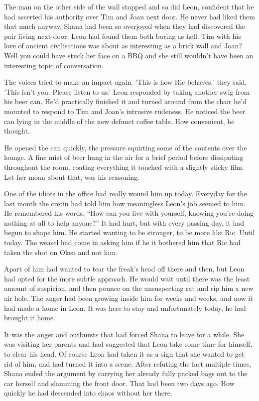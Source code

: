 The man on the other side of the wall stopped and so did Leon, confident that he had asserted his authority over Tim and Joan next door.  He never had liked them that much anyway.  Shana had been so overjoyed when they had discovered the pair living next door.  Leon had found them both boring as hell.  Tim with his love of ancient civilisations was about as interesting as a brick wall and Joan?  Well you could have stuck her face on a BBQ and she still wouldn't have been an interesting topic of conversation.

The voices tried to make an impact again.  'This is how Ric behaves,' they said.  'This isn't you.  Please listen to us.'  Leon responded by taking another swig from his beer can.  He'd practically finished it and  turned around from the chair he'd mounted to respond to Tim and Joan's intrusive rudeness.  He noticed the beer can lying in the middle of the now defunct coffee table.  How convenient, he thought.

He opened the can quickly, the pressure squirting some of the contents over the lounge.  A fine mist of beer hung in the air for a brief period before dissipating throughout the room, coating everything it touched with a slightly sticky film.  Let her moan about that, was his reasoning.

One of the idiots in the office had really wound him up today.  Everyday for the last month the cretin had told him how meaningless Leon's job seemed to him.  He remembered his words, ``How can you live with yourself, knowing you're doing nothing at all to help anyone?''  It had hurt, but with every passing day, it had begun to shape him.  He started wanting to be stronger, to be more like Ric.  Until today.  The weasel had come in asking him if he it bothered him that Ric had taken the shot on Oken and not him.  

Apart of him had wanted to tear the freak's head off there and then, but Leon had opted for the more subtle approach.  He would wait until there was the least amount of suspicion, and then pounce on the unsuspecting rat and rip him a new air hole.  The anger had been growing inside him for weeks and weeks, and now it had made a home in Leon.  It was here to stay and unfortunately today, he had brought it home.

It was the anger and outbursts that had forced Shana to leave for a while.  She was visiting her parents and had suggested that Leon take some time for himself, to clear his head.  Of course Leon had taken it as a sign that she wanted to get rid of him, and had turned it into a scene.  After refuting the fact multiple times, Shana ended the argument by carrying her already fully packed bags out to the car herself and slamming the front door.  That had been two days ago.  How quickly he had descended into chaos without her there.

